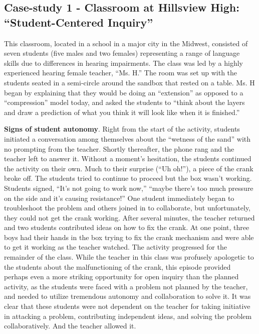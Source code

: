 \documentclass[11.5pt]{sig-alternate} %
\begin{document}
\begin{large}
\subsection*{Case-study 1 - Classroom at Hillsview High: “Stu\-dent-Centered Inquiry”}

This classroom, located in a school in a major city in the Midwest, consisted of seven students (five males and two females) representing a range of language skills due to differences in hearing impairments.  The class was led by a highly experienced hearing female teacher, “Ms. H.”  The room was set up with the students seated in a semi-circle around the sandbox that rested on a table.  Ms. H began by explaining that they would be doing an “extension” as opposed to a “compression” model today, and asked the students to “think about the layers and draw a prediction of what you think it will look like when it is finished.”

\textbf{Signs of student autonomy}. Right from the start of the activity, students initiated a conversation among themselves about the “wetness of the sand” with no prompting from the teacher.  Shortly thereafter, the phone rang and the teacher left to answer it.  Without a moment’s hesitation, the students continued the activity on their own.  Much to their surprise (“Uh oh!”), a piece of the crank broke off.  The students tried to continue to proceed but the box wasn’t working. Students signed, “It’s not going to work now,” “maybe there’s too much pressure on the side and it’s causing resistance!” One student immediately began to troubleshoot the problem and others joined in to collaborate, but unfortunately, they could not get the crank working.  After several minutes, the teacher returned and two students contributed ideas on how to fix the crank.  At one point, three boys had their hands in the box trying to fix the crank mechanism and were able to get it working as the teacher watched.  The activity progressed for the remainder of the class.  While the teacher in this class was profusely apologetic to the students about the malfunctioning of the crank, this episode provided perhaps even a more striking opportunity for open inquiry than the planned activity, as the students were faced with a problem not planned by the teacher, and needed to utilize tremendous autonomy and collaboration to solve it.  It was clear that these students were not dependent on the teacher for taking initiative in attacking a problem, contributing independent ideas, and solving the problem collaboratively.  And the teacher allowed it.


\end{large}
\end{document}
